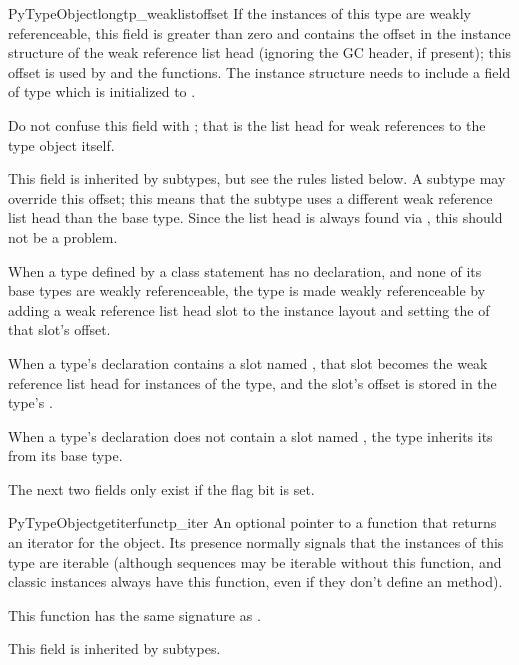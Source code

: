 \begin{cmemberdesc}{PyTypeObject}{long}{tp_weaklistoffset}
  If the instances of this type are weakly referenceable, this field
  is greater than zero and contains the offset in the instance
  structure of the weak reference list head (ignoring the GC header,
  if present); this offset is used by
   and the
   functions.  The instance structure needs
  to include a field of type  which is initialized to
  \NULL.

  Do not confuse this field with ; that is the
  list head for weak references to the type object itself.

  This field is inherited by subtypes, but see the rules listed below.
  A subtype may override this offset; this means that the subtype uses
  a different weak reference list head than the base type.  Since the
  list head is always found via , this
  should not be a problem.

  When a type defined by a class statement has no 
  declaration, and none of its base types are weakly referenceable,
  the type is made weakly referenceable by adding a weak reference
  list head slot to the instance layout and setting the
   of that slot's offset.

  When a type's  declaration contains a slot named
  , that slot becomes the weak reference list head
  for instances of the type, and the slot's offset is stored in the
  type's .

  When a type's  declaration does not contain a slot
  named , the type inherits its
   from its base type.
\end{cmemberdesc}

The next two fields only exist if the
 flag bit is set.

\begin{cmemberdesc}{PyTypeObject}{getiterfunc}{tp_iter}
  An optional pointer to a function that returns an iterator for the
  object.  Its presence normally signals that the instances of this
  type are iterable (although sequences may be iterable without this
  function, and classic instances always have this function, even if
  they don't define an  method).

  This function has the same signature as
  .

  This field is inherited by subtypes.
\end{cmemberdesc}

